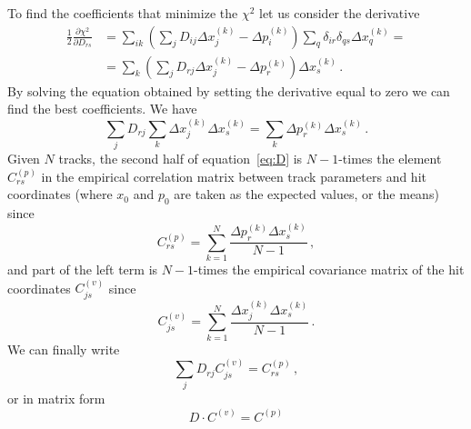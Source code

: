 \documentclass[10pt,a4paper]{article}
\begin{document}
To find the coefficients that minimize the $\chi^2$ let us consider the derivative
\begin{equation}
\begin{aligned}
\frac12\frac{\partial \chi^2}{\partial D_{rs}} &= \sum\limits_{ik}\left(\sum\limits_j D_{ij} \Delta x_j^{(k)} - \Delta p_i^{(k)}\right) \sum\limits_q\delta_{ir}\delta_{qs}\Delta x_q^{(k)} = \\
&= \sum\limits_k\left(\sum\limits_j D_{rj} \Delta x_j^{(k)} - \Delta p_r^{(k)}\right) \Delta x_s^{(k)} \, .
\end{aligned}
\end{equation}
By solving the equation obtained by setting the derivative equal to zero we can find the best coefficients. We have
\begin{equation}
\sum\limits_j D_{rj} \sum\limits_k \Delta x_j^{(k)} \Delta x_s^{(k)} = \sum\limits_k \Delta p_r^{(k)} \Delta x_s^{(k)} \, .
\label{eq:D}
\end{equation}
Given $N$ tracks, the second half of equation~\ref{eq:D} is $N-1$-times the element $C^{(p)}_{rs}$ in the empirical correlation matrix between track parameters and hit coordinates (where $x_0$ and $p_0$ are taken as the expected values, or the means) since
\begin{equation}
C^{(p)}_{rs} = \sum\limits_{k=1}^N \frac{\Delta p_r^{(k)} \Delta x_s^{(k)}}{N-1} \, ,
\end{equation}
and part of the left term is $N-1$-times the empirical covariance matrix of the hit coordinates $C^{(v)}_{js}$ since
\begin{equation}
C^{(v)}_{js} = \sum\limits_{k=1}^N \frac{\Delta x_j^{(k)} \Delta x_s^{(k)}}{N-1} \, .
\end{equation}
We can finally write
\begin{equation}
\sum\limits_j D_{rj} C^{(v)}_{js} = C^{(p)}_{rs} \, ,
\end{equation}
or in matrix form
\begin{equation}
D\cdot C^{(v)} = C^{(p)}
\end{equation}
\end{document}
